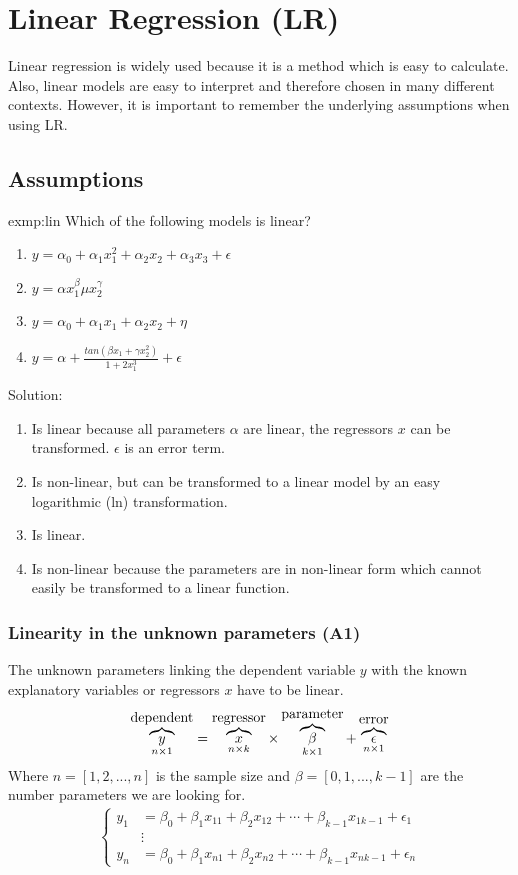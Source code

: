 \section{Linear Regression (LR)}
Linear regression is widely used because it is a method which is easy to calculate. Also, linear models are easy to interpret and therefore chosen in many different contexts. However, it is important to remember the underlying assumptions when using LR.
\subsection{Assumptions}\label{sec:ass}
	\begin{exmp}{exmp:lin}
		Which of the following models is linear?
		\begin{enumerate}
			\item $y=\alpha_0+\alpha_1 x_1^2+\alpha_2 x_2 + \alpha_3 x_3 + \epsilon$
			\item $y=\alpha x_1^\beta \mu x_2^\gamma$
			\item $y=\alpha_0+\alpha_1 x_1+\alpha_2 x_2 + \eta$
			\item $y=\alpha+\frac{tan\left(\beta x_1 + \gamma x_2^2\right)}{1+2 x_1^3} + \epsilon$
		\end{enumerate}
		Solution:
		\begin{enumerate}
			\item Is linear because all parameters $\alpha$ are linear, the regressors $x$ can be transformed. $\epsilon$ is an error term.
			\item Is non-linear, but can be transformed to a linear model by an easy logarithmic (ln) transformation.
			\item Is linear.
			\item Is non-linear because the parameters are in non-linear form which cannot easily be transformed to a linear function.
		\end{enumerate}		
	\end{exmp}
	\subsubsection{Linearity in the unknown parameters (A1)}\label{sec:ass1}
		The unknown parameters linking the dependent variable $y$ with the known explanatory variables or regressors $x$ have to be linear.  
		\begin{equation*}
			\overbrace{y}^{\hbox{dependent}}_{n\times 1}=\overbrace{x}^{\hbox{regressor}}_{n\times k}\times\overbrace{\beta}^{\hbox{parameter}}_{k\times 1}+\overbrace{\epsilon}^{\hbox{error}}_{n\times 1}
		\end{equation*}
		Where $n=[1,2,...,n]$ is the sample size and $\beta=[0,1,...,k-1]$ are the number parameters we are looking for.
		\begin{align*}
			\begin{cases}
				y_1&=\beta_0+\beta_1 x_{11}+\beta_2 x_{12}+\cdots+\beta_{k-1} x_{1k-1}+\epsilon_1\\
				&\vdots\\
				y_n&=\beta_0+\beta_1 x_{n1}+\beta_2 x_{n2}+\cdots+\beta_{k-1} x_{nk-1}+\epsilon_n
			\end{cases}			
		\end{align*}
